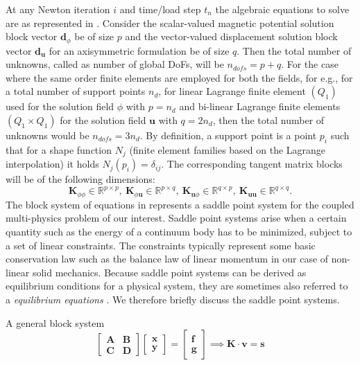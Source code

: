 At any Newton iteration $i$ and time/load step $t_n$ the algebraic equations to solve are as represented in . Consider the scalar-valued magnetic potential solution block vector $\mathbf{d}_{\phi}$ be of size $p$ and the vector-valued displacement solution block vector $\mathbf{d}_{\mathbf{u}}$ for an axisymmetric formulation be of size $q$. Then the total number of unknowns, called as number of global DoFs, will be $n_{dofs} = p + q$. For the case where the same order finite elements are employed for both the fields, for e.g., for a total number of support points $n_d$, for linear Lagrange finite element $(Q_1)$ used for the solution field $\phi$ with $p = n_d$ and bi-linear Lagrange finite elements $(Q_1 \times Q_1)$ for the solution field $\mathbf{u}$ with $q = 2 n_d$, then the total number of unknowns would be $n_{dofs} = 3 n_d$. By definition, a support point is a point $p_i$ such that for a shape function $N_j$ (finite element families based on the Lagrange interpolation) it holds $N_j (p_i) = \delta_{ij}$. The corresponding tangent matrix blocks will be of the following dimensions:
\begin{equation}
\mathbf{K}_{\phi \phi} \in \mathbb{R}^{p \times p}, \ \mathbf{K}_{\phi \mathbf{u}} \in \mathbb{R}^{p \times q}, \ \mathbf{K}_{\mathbf{u} \phi} \in \mathbb{R}^{q \times p}, \ \mathbf{K}_{\mathbf{u} \mathbf{u}} \in \mathbb{R}^{q \times q}.
\end{equation}
The block system of equations in  represents a saddle point system for the coupled multi-physics problem of our interest. Saddle point systems arise when a certain quantity such as the energy of a continuum body has to be minimized, subject to a set of linear constraints. The constraints typically represent some basic conservation law such as the balance law of linear momentum in our case of non-linear solid mechanics. Because saddle point systems can be derived as equilibrium conditions for a physical system, they are sometimes also referred to a \textit{equilibrium equations} \cite{Benzi2005}. We therefore briefly discuss the saddle point systems. \newline \par 
\noindent A general block system 
\begin{equation}
\begin{bmatrix}
\mathbf{A} & \mathbf{B} \\
\mathbf{C} & \mathbf{D}
\end{bmatrix}
\begin{bmatrix}
\mathbf{x} \\
\mathbf{y}
\end{bmatrix}
=
\begin{bmatrix}
\mathbf{f} \\
\mathbf{g}
\end{bmatrix}
\implies \mathbf{K} \cdot \mathbf{v} = \mathbf{s}
\label{eq:3.11}
\end{equation}
